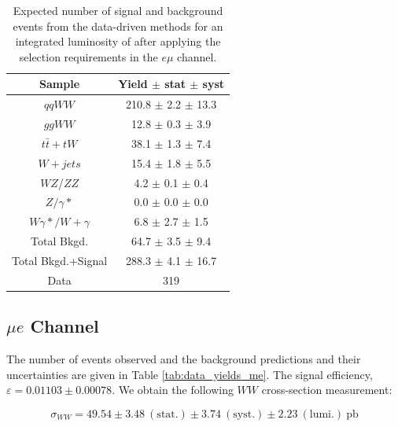 \begin{table}[ht!]
  \begin{center}
  \begin{tabular} {|c|c|}
\hline
Sample                & Yield $\pm$ stat $\pm$ syst \\ \hline \hline
$qqWW$                & 210.8 $\pm$  2.2 $\pm$ 13.3  \\ \hline
$ggWW$                & 12.8 $\pm$  0.3 $\pm$  3.9  \\ \hline
$t\bar{t} + tW$      & 38.1 $\pm$  1.3 $\pm$  7.4  \\ \hline
$W+jets$              & 15.4 $\pm$  1.8 $\pm$  5.5  \\ \hline
$WZ$/$ZZ$             &  4.2 $\pm$  0.1 $\pm$  0.4  \\ \hline
$Z/\gamma*$          &  0.0 $\pm$  0.0 $\pm$  0.0  \\ \hline
$W\gamma*/W+\gamma$ &  6.8 $\pm$  2.7 $\pm$  1.5  \\ \hline \hline
Total Bkgd.           & 64.7 $\pm$  3.5 $\pm$  9.4  \\ \hline \hline
Total Bkgd.+Signal    & 288.3 $\pm$  4.1 $\pm$ 16.7  \\ \hline \hline
Data                  & 319 \\ \hline
\end{tabular}
  \caption{Expected number of signal and background events from the data-driven methods for
  an integrated luminosity of \intlumi after applying the selection requirements in the $e \mu$ channel.}
   \label{tab:data_yields_em}
  \end{center}
\end{table}

%
%
%
\subsection{$\mu e$ Channel}

The number of events observed and the background predictions and their uncertainties are
given in Table \ref{tab:data_yields_me}.
The signal efficiency,  $\varepsilon = 0.01103 \pm 0.00078$.
We obtain the following $WW$ cross-section measurement:

\begin{equation*}
\sigma_{WW}  = 49.54 \pm 3.48~\mathrm{(stat.)} \pm 3.74~\mathrm{(syst.)} \pm 2.23~\mathrm{(lumi.)~pb} 
\end{equation*}

